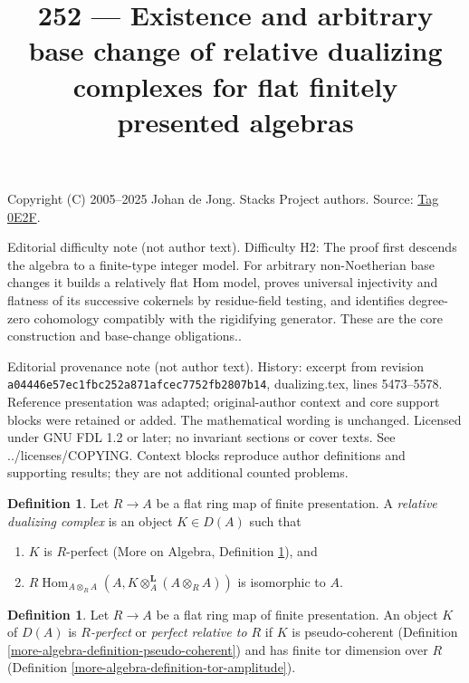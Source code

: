 \documentclass{amsart}
\theoremstyle{plain}
\theoremstyle{definition}
\newtheorem{definition}[subsection]{Definition}
\theoremstyle{remark}
\numberwithin{equation}{subsection}
\def\Hom{\mathop{\mathrm{Hom}}\nolimits}
\begin{document}
\title[Stacks Project, Tag 0E2F]{252 --- Existence and arbitrary base change of relative dualizing complexes for flat finitely presented algebras}
\maketitle
\noindent Copyright (C) 2005--2025 Johan de Jong. Stacks Project authors. Source: \href{https://stacks.math.columbia.edu/tag/0E2F}{Tag 0E2F}.

\noindent Editorial difficulty note (not author text). Difficulty H2: The proof first descends the algebra to a finite-type integer model. For arbitrary non-Noetherian base changes it builds a relatively flat Hom model, proves universal injectivity and flatness of its successive cokernels by residue-field testing, and identifies degree-zero cohomology compatibly with the rigidifying generator. These are the core construction and base-change obligations..

\noindent Editorial provenance note (not author text). History: excerpt from revision \texttt{a0444\allowbreak 6e57e\allowbreak c1fbc\allowbreak 252a8\allowbreak 71afc\allowbreak ec775\allowbreak 2fb28\allowbreak 07b14}, dualizing.tex, lines 5473--5578. Reference presentation was adapted; original-author context and core support blocks were retained or added. The mathematical wording is unchanged. Licensed under GNU FDL 1.2 or later; no invariant sections or cover texts. See ../licenses/COPYING. Context blocks reproduce author definitions and supporting results; they are not additional counted problems.

\begin{definition}
\label{definition-relative-dualizing-complex}
Let $R \to A$ be a flat ring map of finite presentation.
A {\it relative dualizing complex} is an object $K \in D(A)$ such that
\begin{enumerate}
\item $K$ is $R$-perfect (More on Algebra, Definition
\ref{more-algebra-definition-relatively-perfect}), and
\item $R\Hom_{A \otimes_R A}(A, K \otimes_A^\mathbf{L} (A \otimes_R A))$
is isomorphic to $A$.
\end{enumerate}
\end{definition}

\begin{definition}
\label{more-algebra-definition-relatively-perfect}
Let $R \to A$ be a flat ring map of finite presentation.
An object $K$ of $D(A)$ is {\it $R$-perfect} or {\it perfect relative to $R$}
if $K$ is pseudo-coherent
(Definition \ref{more-algebra-definition-pseudo-coherent})
and has finite tor dimension over $R$
(Definition \ref{more-algebra-definition-tor-amplitude}).
\end{definition}
\end{document}
